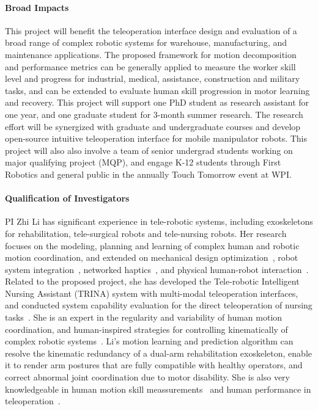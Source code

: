 \paragraph*{Broad Impacts}
This project will benefit the teleoperation interface design and evaluation of a broad range of complex robotic systems for warehouse, manufacturing, and maintenance applications. The proposed framework for motion decomposition and performance metrics can be generally applied to measure the worker skill level and progress for industrial, medical, assistance, construction and military tasks, and can be extended to evaluate human skill progression in motor learning and recovery. This project will support one PhD student as research assistant for one year, and one graduate student for 3-month summer research. The research effort will be synergized with graduate and undergraduate courses and develop open-source intuitive teleoperation interface for mobile manipulator robots.  This project will also also involve a team of senior undergrad students working on major qualifying project (MQP), and engage K-12 students through First Robotics and general public in the annually Touch Tomorrow event at WPI.

 
\paragraph*{Qualification of Investigators}
PI Zhi Li has significant experience in tele-robotic systems, including exoskeletons for rehabilitation, tele-surgical robots and tele-nursing robots. Her research focuses on the modeling, planning and learning of complex human and robotic motion coordination, and extended on mechanical design optimization~\cite{li2016design}, robot system integration~\cite{Hauser_Li_TRINA:17}, networked haptics~\cite{li2009networked,li2009remote}, and physical human-robot interaction~\cite{Hauser_Li_BiTelepresence:17}. Related to the proposed project, she has developed the Tele-robotic Intelligent Nursing Assistant (TRINA) system with multi-modal teleoperation interfaces, and conducted system capability evaluation for the direct teleoperation of nursing tasks~\cite{Hauser_Li_TRINA:17}. She is an expert in the regularity and variability of human motion coordination, and human-inspired strategies for controlling kinematically of complex robotic systems~\cite{kim2012resolving,Rosen_Li_EMBC:13,Rosen_Li_IROSChapt:13,Rosen_Li_IROS:14,Rosen_Li_J:14, Rosen_Li:17}. Li's motion learning and prediction algorithm can resolve the kinematic redundancy of a dual-arm rehabilitation exoskeleton, enable it to render arm postures that are fully compatible with healthy operators, and correct abnormal joint coordination due to motor disability. She is also very knowledgeable in human motion skill meassurements~\cite{Rosen_Li_EMBC:15} and human performance in teleoperation~\cite{Hauser_Li_BiTelepresence:17}. 

